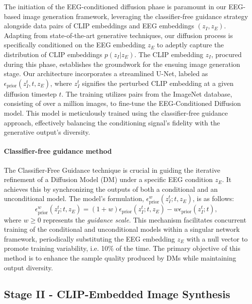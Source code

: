 \documentclass{article}
\begin{document}
The initiation of the EEG-conditioned diffusion phase is paramount in our EEG-based image generation framework, leveraging the classifier-free guidance strategy alongside data pairs of CLIP embeddings and EEG embeddings \((z_I, z_E)\).
Adapting from state-of-the-art generative techniques, our diffusion process is specifically conditioned on the EEG embedding \( z_E \) to adeptly capture the distribution of CLIP embeddings \( p(z_I|z_E) \). The CLIP embedding \( z_I \), procured during this phase, establishes the groundwork for the ensuing image generation stage. Our architecture incorporates a streamlined U-Net, labeled as \( \epsilon_{\text{prior}}(z^t_I, t, z_E) \), where \( z^t_I \) signifies the perturbed CLIP embedding at a given diffusion timestep \( t \). The training utilizes pairs from the ImageNet database, consisting of over a million images, to fine-tune the EEG-Conditioned Diffusion model. This model is meticulously trained using the classifier-free guidance approach, effectively balancing the conditioning signal's fidelity with the generative output's diversity.

\paragraph{Classifier-free guidance method} The Classifier-Free Guidance technique is crucial in guiding the iterative refinement of a Diffusion Model (DM) under a specific EEG condition \( z_E \). It achieves this by synchronizing the outputs of both a conditional and an unconditional model. The model's formulation, \( \epsilon^w_{\text{prior}}(z_I^t; t, z_E) \), is as follows:
\begin{equation}
\epsilon^w_{\text{prior}}(z_I^t; t, z_E) = (1 + w)\epsilon_{\text{prior}}(z_I^t; t, z_E) - w\epsilon_{\text{prior}}(z_I^t; t),
\end{equation}
where \( w \geq 0 \) represents the {\it guidance scale}. This mechanism facilitates concurrent training of the conditional and unconditional models within a singular network framework, periodically substituting the EEG embedding \( z_E \) with a null vector to promote training variability, i.e. 10\% of the time. The primary objective of this method is to enhance the sample quality produced by DMs while maintaining output diversity.

\subsection{Stage II - CLIP-Embedded Image Synthesis}
\end{document}
